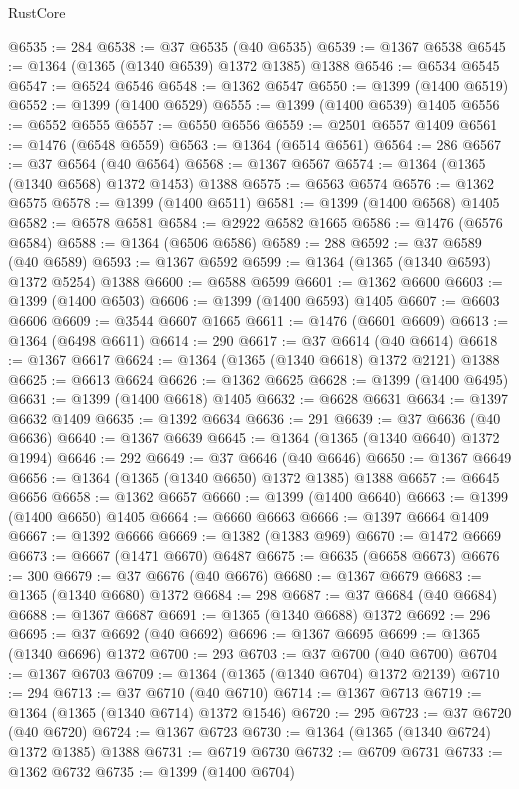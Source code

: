\begin{lexlean}{RustCore}
\begin{coremodule}
@6535 := 284
@6538 := @37 @6535 (@40 @6535)
@6539 := @1367 @6538
@6545 := @1364 (@1365 (@1340 @6539) @1372 @1385) @1388
@6546 := @6534 @6545
@6547 := @6524 @6546
@6548 := @1362 @6547
@6550 := @1399 (@1400 @6519)
@6552 := @1399 (@1400 @6529)
@6555 := @1399 (@1400 @6539) @1405
@6556 := @6552 @6555
@6557 := @6550 @6556
@6559 := @2501 @6557 @1409
@6561 := @1476 (@6548 @6559)
@6563 := @1364 (@6514 @6561)
@6564 := 286
@6567 := @37 @6564 (@40 @6564)
@6568 := @1367 @6567
@6574 := @1364 (@1365 (@1340 @6568) @1372 @1453) @1388
@6575 := @6563 @6574
@6576 := @1362 @6575
@6578 := @1399 (@1400 @6511)
@6581 := @1399 (@1400 @6568) @1405
@6582 := @6578 @6581
@6584 := @2922 @6582 @1665
@6586 := @1476 (@6576 @6584)
@6588 := @1364 (@6506 @6586)
@6589 := 288
@6592 := @37 @6589 (@40 @6589)
@6593 := @1367 @6592
@6599 := @1364 (@1365 (@1340 @6593) @1372 @5254) @1388
@6600 := @6588 @6599
@6601 := @1362 @6600
@6603 := @1399 (@1400 @6503)
@6606 := @1399 (@1400 @6593) @1405
@6607 := @6603 @6606
@6609 := @3544 @6607 @1665
@6611 := @1476 (@6601 @6609)
@6613 := @1364 (@6498 @6611)
@6614 := 290
@6617 := @37 @6614 (@40 @6614)
@6618 := @1367 @6617
@6624 := @1364 (@1365 (@1340 @6618) @1372 @2121) @1388
@6625 := @6613 @6624
@6626 := @1362 @6625
@6628 := @1399 (@1400 @6495)
@6631 := @1399 (@1400 @6618) @1405
@6632 := @6628 @6631
@6634 := @1397 @6632 @1409
@6635 := @1392 @6634
@6636 := 291
@6639 := @37 @6636 (@40 @6636)
@6640 := @1367 @6639
@6645 := @1364 (@1365 (@1340 @6640) @1372 @1994)
@6646 := 292
@6649 := @37 @6646 (@40 @6646)
@6650 := @1367 @6649
@6656 := @1364 (@1365 (@1340 @6650) @1372 @1385) @1388
@6657 := @6645 @6656
@6658 := @1362 @6657
@6660 := @1399 (@1400 @6640)
@6663 := @1399 (@1400 @6650) @1405
@6664 := @6660 @6663
@6666 := @1397 @6664 @1409
@6667 := @1392 @6666
@6669 := @1382 (@1383 @969)
@6670 := @1472 @6669
@6673 := @6667 (@1471 @6670) @6487
@6675 := @6635 (@6658 @6673)
@6676 := 300
@6679 := @37 @6676 (@40 @6676)
@6680 := @1367 @6679
@6683 := @1365 (@1340 @6680) @1372
@6684 := 298
@6687 := @37 @6684 (@40 @6684)
@6688 := @1367 @6687
@6691 := @1365 (@1340 @6688) @1372
@6692 := 296
@6695 := @37 @6692 (@40 @6692)
@6696 := @1367 @6695
@6699 := @1365 (@1340 @6696) @1372
@6700 := 293
@6703 := @37 @6700 (@40 @6700)
@6704 := @1367 @6703
@6709 := @1364 (@1365 (@1340 @6704) @1372 @2139)
@6710 := 294
@6713 := @37 @6710 (@40 @6710)
@6714 := @1367 @6713
@6719 := @1364 (@1365 (@1340 @6714) @1372 @1546)
@6720 := 295
@6723 := @37 @6720 (@40 @6720)
@6724 := @1367 @6723
@6730 := @1364 (@1365 (@1340 @6724) @1372 @1385) @1388
@6731 := @6719 @6730
@6732 := @6709 @6731
@6733 := @1362 @6732
@6735 := @1399 (@1400 @6704)

\end{coremodule}
\end{lexlean}
